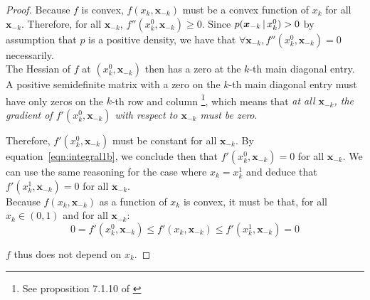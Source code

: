 \begin{proof}
Because $f$ is convex, $f(x_k, \mathbf{x}_{-k})$ must be a convex function of $x_k$ for all $\mathbf{x}_{-k}$. Therefore, for all $\mathbf{x}_{-k}$, $f''(x^0_k, \mathbf{x}_{-k}) \geq 0$. Since $p(\mbox{\boldmath $x$}_{-k} {\,|\,} x^0_k) > 0$ by assumption that $p$ is a positive density, we have that $\forall \mathbf{x}_{-k}, f''(x^0_k, \mathbf{x}_{-k}) = 0$ necessarily.\\

The Hessian of $f$ at $(x^0_k, \mathbf{x}_{-k})$ then has a zero at the $k$-th main diagonal entry. A positive semidefinite matrix with a zero on the $k$-th main diagonal entry must have only zeros on the $k$-th row and column \footnote{ See proposition 7.1.10 of \citet{HJ90}}, which means that \emph{at all $\mathbf{x}_{-k}$, the gradient of $f'(x^0_k, \mathbf{x}_{-k})$ with respect to $\mathbf{x}_{-k}$ must be zero}.

Therefore, $f'(x_k^0, \mathbf{x}_{-k})$ must be constant for all $\mathbf{x}_{-k}$. By equation~\ref{eqn:integral1b}, we conclude then that $f'(x_k^0, \mathbf{x}_{-k}) = 0$ for all $\mathbf{x}_{-k}$. We can use the same reasoning for the case where $x_k = x_k^1$ and deduce that $f'(x^1_k, \mathbf{x}_{-k}) = 0$ for all $\mathbf{x}_{-k}$. \\

Because $f(x_k, \mathbf{x}_{-k})$ as a function of $x_k$ is convex, it must be that, for all $x_k \in (0,1)$ and for all $\mathbf{x}_{-k}$:
\[
0 = f'(x_k^0, \mathbf{x}_{-k}) \leq f'(x_k, \mathbf{x}_{-k}) \leq 
    f'(x_k^1, \mathbf{x}_{-k}) = 0
\]

$f$ thus does not depend on $x_k$.


\end{proof}

